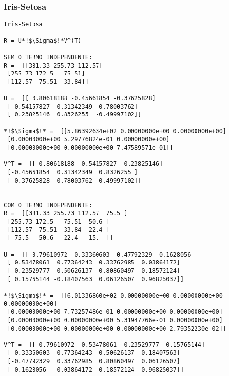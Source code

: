 \documentclass[a4paper,12pt,twoside]{article}
\begin{document}
\subsubsection{Iris-Setosa}
\begin{lstlisting}
Iris-Setosa

R = U*!$\Sigma$!*V^(T)

SEM O TERMO INDEPENDENTE: 
R =  [[381.33 255.73 112.57]
 [255.73 172.5   75.51]
 [112.57  75.51  33.84]]

U =  [[ 0.80618188 -0.45661854 -0.37625828]
 [ 0.54157827  0.31342349  0.78003762]
 [ 0.23825146  0.8326255  -0.49997102]]

*!$\Sigma$!* =  [[5.86392634e+02 0.00000000e+00 0.00000000e+00]
 [0.00000000e+00 5.29776824e-01 0.00000000e+00]
 [0.00000000e+00 0.00000000e+00 7.47589571e-01]]

V^T =  [[ 0.80618188  0.54157827  0.23825146]
 [-0.45661854  0.31342349  0.8326255 ]
 [-0.37625828  0.78003762 -0.49997102]]


COM O TERMO INDEPENDENTE: 
R =  [[381.33 255.73 112.57  75.5 ]
 [255.73 172.5   75.51  50.6 ]
 [112.57  75.51  33.84  22.4 ]
 [ 75.5   50.6   22.4   15.  ]]

U =  [[ 0.79610972 -0.33360603 -0.47792329 -0.1628056 ]
 [ 0.53478061  0.77364243  0.33762985  0.03864172]
 [ 0.23529777 -0.50626137  0.80860497 -0.18572124]
 [ 0.15765144 -0.18407563  0.06126507  0.96825037]]

*!$\Sigma$!* =  [[6.01336860e+02 0.00000000e+00 0.00000000e+00 0.00000000e+00]
 [0.00000000e+00 7.73257486e-01 0.00000000e+00 0.00000000e+00]
 [0.00000000e+00 0.00000000e+00 5.31947766e-01 0.00000000e+00]
 [0.00000000e+00 0.00000000e+00 0.00000000e+00 2.79352230e-02]]

V^T =  [[ 0.79610972  0.53478061  0.23529777  0.15765144]
 [-0.33360603  0.77364243 -0.50626137 -0.18407563]
 [-0.47792329  0.33762985  0.80860497  0.06126507]
 [-0.1628056   0.03864172 -0.18572124  0.96825037]]
\end{lstlisting}
\end{document}
